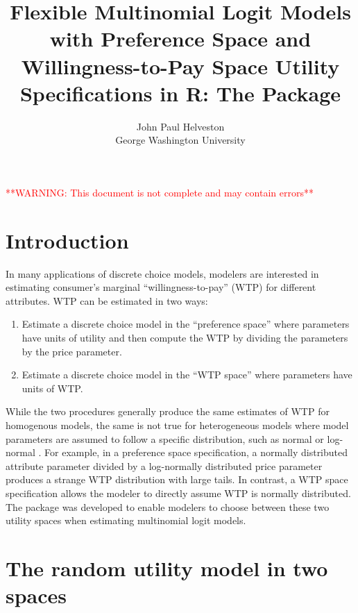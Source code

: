 \documentclass[article]{jss}
\author{
John Paul Helveston\\George Washington University
}
\title{Flexible Multinomial Logit Models with Preference Space and
Willingness-to-Pay Space Utility Specifications in R: The \pkg{logitr}
Package}
\providecommand{\tightlist}{%
  \setlength{\itemsep}{0pt}\setlength{\parskip}{0pt}}
\begin{document}
\newcommand{\betaVec}{\boldsymbol\upbeta}
\newcommand{\omegaVec}{\boldsymbol\upomega}
\newcommand{\zetaVec}{\boldsymbol\upzeta}
\newcommand{\deltaVec}{\boldsymbol\updelta}
\newcommand{\gammaVec}{\boldsymbol\upgamma}
\newcommand{\epsilonVec}{\boldsymbol\upepsilon}
\newcommand{\xVec}{\mathrm{\mathbf{x}}}
\newcommand{\XVec}{\mathrm{\mathbf{X}}}

\begin{center}
\textcolor{red}{**WARNING: This document is not complete and may contain errors**}
\end{center}

\hypertarget{introduction}{%
\section{Introduction}\label{introduction}}

In many applications of discrete choice models, modelers are interested
in estimating consumer's marginal ``willingness-to-pay'' (WTP) for
different attributes. WTP can be estimated in two ways:

\begin{enumerate}
\def\labelenumi{\arabic{enumi}.}
\tightlist
\item
  Estimate a discrete choice model in the ``preference space'' where
  parameters have units of utility and then compute the WTP by dividing
  the parameters by the price parameter.
\item
  Estimate a discrete choice model in the ``WTP space'' where parameters
  have units of WTP.
\end{enumerate}

While the two procedures generally produce the same estimates of WTP for
homogenous models, the same is not true for heterogeneous models where
model parameters are assumed to follow a specific distribution, such as
normal or log-normal \citep{Train2005}. For example, in a preference
space specification, a normally distributed attribute parameter divided
by a log-normally distributed price parameter produces a strange WTP
distribution with large tails. In contrast, a WTP space specification
allows the modeler to directly assume WTP is normally distributed. The
 package was developed to enable modelers to choose between
these two utility spaces when estimating multinomial logit models.

\hypertarget{the-random-utility-model-in-two-spaces}{%
\section{The random utility model in two
spaces}\label{the-random-utility-model-in-two-spaces}}
\end{document}
